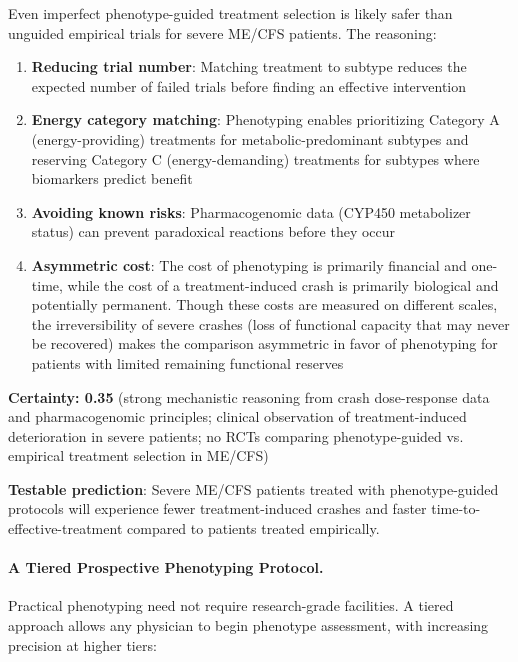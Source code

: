 \begin{hypothesis}
\label{hyp:phenotyping-harm-reduction}
Even imperfect phenotype-guided treatment selection is likely safer than unguided empirical trials for severe ME/CFS patients. The reasoning:

\begin{enumerate}
    \item \textbf{Reducing trial number}: Matching treatment to subtype reduces the expected number of failed trials before finding an effective intervention
    \item \textbf{Energy category matching}: Phenotyping enables prioritizing Category A (energy-providing) treatments for metabolic-predominant subtypes and reserving Category C (energy-demanding) treatments for subtypes where biomarkers predict benefit
    \item \textbf{Avoiding known risks}: Pharmacogenomic data (CYP450 metabolizer status) can prevent paradoxical reactions before they occur
    \item \textbf{Asymmetric cost}: The cost of phenotyping is primarily financial and one-time, while the cost of a treatment-induced crash is primarily biological and potentially permanent. Though these costs are measured on different scales, the irreversibility of severe crashes (loss of functional capacity that may never be recovered) makes the comparison asymmetric in favor of phenotyping for patients with limited remaining functional reserves
\end{enumerate}

\textbf{Certainty: 0.35} (strong mechanistic reasoning from crash dose-response data and pharmacogenomic principles; clinical observation of treatment-induced deterioration in severe patients; no RCTs comparing phenotype-guided vs. empirical treatment selection in ME/CFS)

\textbf{Testable prediction}: Severe ME/CFS patients treated with phenotype-guided protocols will experience fewer treatment-induced crashes and faster time-to-effective-treatment compared to patients treated empirically.
\end{hypothesis}

\paragraph{A Tiered Prospective Phenotyping Protocol.}
Practical phenotyping need not require research-grade facilities. A tiered approach allows any physician to begin phenotype assessment, with increasing precision at higher tiers:

